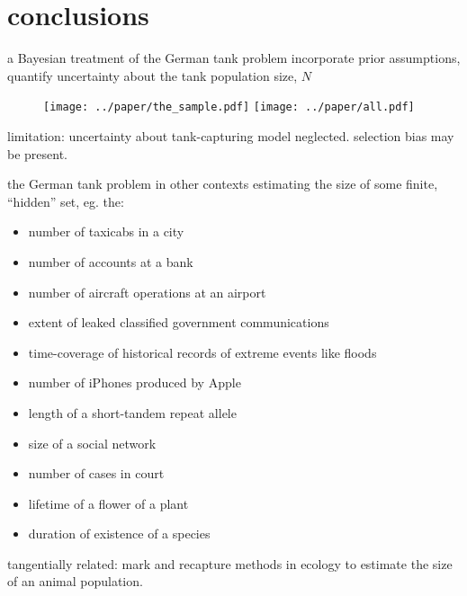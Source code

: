 \documentclass[10pt]{beamer}
\begin{document}
\section{conclusions}


\begin{frame}[t]{a Bayesian treatment of the German tank problem}
	incorporate prior assumptions, quantify uncertainty about the tank population size, $N$
	
	\begin{figure}[h!]
		\centering
 		\texttt{[image: ../paper/the\_sample.pdf]}
 		\texttt{[image: ../paper/all.pdf]}
	\end{figure}
	
	\pause
	
	\alert{limitation}: uncertainty about tank-capturing model neglected. selection bias may be present.
\end{frame}

\begin{frame}[t]{the German tank problem in other contexts}
estimating the size of some finite, ``hidden'' set, eg. the:
\begin{itemize} 
\item number of taxicabs in a city 
\item number of accounts at a bank
\item  number of aircraft operations at an airport
\item  extent of leaked classified government communications
\item  time-coverage of historical records of extreme events like floods
\item  number of iPhones produced by Apple 
\item  length of a short-tandem repeat allele 
\item  size of a social network 
\item  number of cases in court 
\item  lifetime of a flower of a plant 
\item duration of existence of a species 
\end{itemize}

tangentially related: mark and recapture methods in ecology to estimate the size of an animal population. 
\end{frame}
\end{document}
